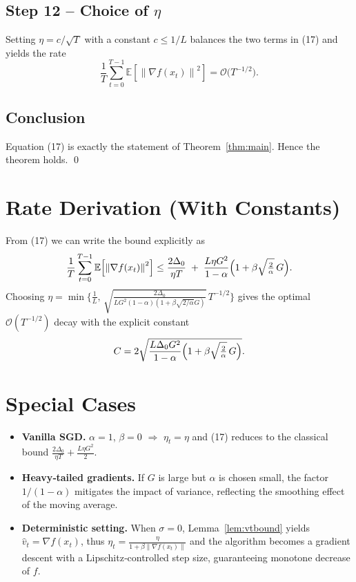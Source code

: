 \documentclass{article}
\newcommand{\EE}{\mathbb{E}}
\newcommand{\norm}[1]{\left\|#1\right\|}
\begin{document}
\subsection*{Step 12 – Choice of $\eta$}
Setting $\eta = c/\sqrt{T}$ with a constant $c\le 1/L$ balances the two terms in (17) and yields the rate
\[
\frac{1}{T}\sum_{t=0}^{T-1}\EE\!\left[\norm{\nabla f(x_t)}^{2}\right]
= \mathcal{O}\!\bigl(T^{-1/2}\bigr).
\tag{18}
\]

\subsection*{Conclusion}
Equation (17) is exactly the statement of Theorem~\ref{thm:main}. Hence the theorem holds. \qed

\section*{Rate Derivation (With Constants)}
From (17) we can write the bound explicitly as
\[
\frac{1}{T}\sum_{t=0}^{T-1}\EE\!\left[\norm{\nabla f(x_t)}^{2}\right]
\le
\frac{2\Delta_0}{\eta T}
\;+\;
\frac{L\eta G^{2}}{1-\alpha}
\Bigl(1+\beta\sqrt{\tfrac{2}{\alpha}}\,G\Bigr).
\]
Choosing $\eta = \min\bigl\{ \tfrac{1}{L},\,\sqrt{\tfrac{2\Delta_0}{L G^{2}(1-\alpha)(1+\beta\sqrt{2/\alpha}G)} }\, T^{-1/2}\bigr\}$ gives the optimal $\mathcal{O}(T^{-1/2})$ decay with the explicit constant
\[
C=
2\sqrt{ \frac{L\Delta_0 G^{2}}{1-\alpha}\Bigl(1+\beta\sqrt{\tfrac{2}{\alpha}}\,G\Bigr)} .
\]

\section*{Special Cases}
\begin{itemize}
\item \textbf{Vanilla SGD.} $\alpha=1$, $\beta=0$ $\Rightarrow$ $\eta_t=\eta$ and (17) reduces to the classical bound $\frac{2\Delta_0}{\eta T}+ \frac{L\eta G^{2}}{2}$.
\item \textbf{Heavy‑tailed gradients.} If $G$ is large but $\alpha$ is chosen small, the factor $1/(1-\alpha)$ mitigates the impact of variance, reflecting the smoothing effect of the moving average.
\item \textbf{Deterministic setting.} When $\sigma=0$, Lemma~\ref{lem:vtbound} yields $\hat v_t=\nabla f(x_t)$, thus $\eta_t=\frac{\eta}{1+\beta\norm{\nabla f(x_t)}}$ and the algorithm becomes a gradient descent with a Lipschitz‑controlled step size, guaranteeing monotone decrease of $f$.
\end{itemize}
\end{document}
